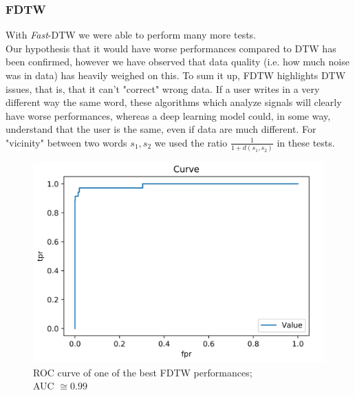 \documentclass[8pt,notitlepage]{report}
\begin{document}
		\newpage		
		
		\subsubsection{FDTW}
			With \textit{Fast}-DTW we were able to perform many more tests. \\
			Our hypothesis that it would have worse performances compared to DTW has been confirmed, however we have observed that data quality (i.e. how much noise was in data) has heavily weighed on this. To sum it up, FDTW highlights DTW issues, that is, that it can't "correct" wrong data. If a user writes in a very different way the same word, these algorithms which analyze signals will clearly have worse performances, whereas a deep learning model could, in some way, understand that the user is the same, even if data are much different. For "vicinity" between two words $ s_1, s_2 $ we used the ratio $ \frac{1}{1 + d(s_1, s_2)} $ in these tests. 
			
			\begin{figure}[H]
				\begin{center}
					\includegraphics[scale=.35]{ROC_FDTW_Giovanni}
					\caption{ROC curve of one of the best FDTW performances;\\ AUC $ \cong 0.99 $}
				\end{center}
			\end{figure}
			
\end{document}

